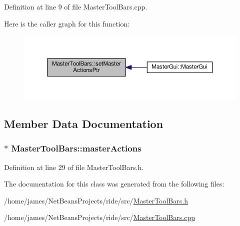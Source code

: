 Definition at line 9 of file Master\-Tool\-Bars.\-cpp.



Here is the caller graph for this function\-:
\nopagebreak
\begin{figure}[H]
\begin{center}
\leavevmode
\includegraphics[width=350pt]{class_master_tool_bars_a8cc2c4f46779f429221b1dee8ad58181_icgraph}
\end{center}
\end{figure}




\subsection{Member Data Documentation}
\hypertarget{class_master_tool_bars_a1adde6a67eaa64fbbbf65ffcb8c1590f}{
\subsubsection[{master\-Actions}]{$\ast$ Master\-Tool\-Bars\-::master\-Actions\hspace{0.3cm}{\ttfamily [private]}}}\label{class_master_tool_bars_a1adde6a67eaa64fbbbf65ffcb8c1590f}


Definition at line 29 of file Master\-Tool\-Bars.\-h.



The documentation for this class was generated from the following files\-:\begin{DoxyCompactItemize}
\item 
/home/james/\-Net\-Beans\-Projects/ride/src/\hyperlink{_master_tool_bars_8h}{Master\-Tool\-Bars.\-h}\item 
/home/james/\-Net\-Beans\-Projects/ride/src/\hyperlink{_master_tool_bars_8cpp}{Master\-Tool\-Bars.\-cpp}\end{DoxyCompactItemize}
